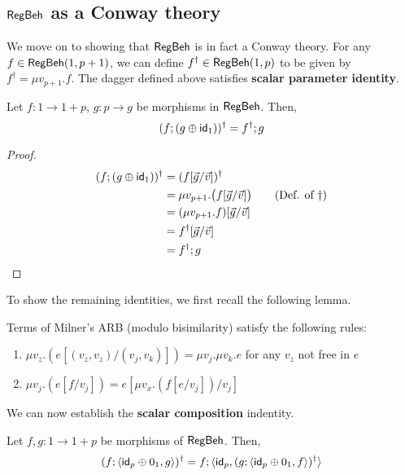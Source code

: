 \subsection{$\mathsf{RegBeh}$ as a Conway theory}
We move on to showing that $\mathsf{RegBeh}$ is in fact a Conway theory. For any $f \in \mathsf{RegBeh}(1, p + 1)$, we can define $f^\dagger \in \mathsf{RegBeh}(1,p)$ to be given by $f^\dagger = \mu v_{p+1}.f$.
The dagger defined above satisfies \textbf{scalar parameter identity}.
\begin{lemma}\label{conway1}
	Let $f \colon 1 \to 1 + p$, $g \colon p \to g$ be morphisms in $\mathsf{RegBeh}$. Then,
	$$
	(f ; (g\oplus \mathsf{id}_1))^\dagger = f^\dagger ; g
	$$
\end{lemma}
\begin{proof}
\begin{align*}
(f ; (g \oplus \mathsf{id}_1))^\dagger & = (f[\vec{g}/\vec{v}])^\dagger
\\
& = \mu v_{p+1}.\big(f[\vec{g}/\vec{v}]\big) \tag{Def. of $\dagger$}
\\
& = (\mu v_{p+1}.f)[\vec{g}/\vec{v}] 
\\
& = f^\dagger[\vec{g}/\vec{v}] 
\\
& = f^\dagger ; g
\end{align*}
\end{proof}
To show the remaining identities, we first recall the following lemma.
 \begin{lemma}
\label{lem:recursion-substitution}
Terms of Milner's ARB (modulo bisimilarity) satisfy the following rules:
	\begin{enumerate}
		\item $\mu v_z. \left(e [(v_z, v_z) / (v_j, v_k)]\right) = \mu v_j. \mu v_k. e$ for any $v_z$ not free in $e$
		\item $ \mu v_j.\left(e[f/v_j]\right) = e[\mu v_x. \left(f[e/v_j]\right)/v_j]$
	\end{enumerate}
\end{lemma}
We can now establish the \textbf{scalar composition} indentity.
\begin{lemma}\label{conway2}
Let $f,g \colon 1 \to 1 + p$ be morphisms of $\mathsf{RegBeh}$. Then,
		$$
		(f ; \langle  \mathsf{id}_p \oplus 0_1 , g \rangle)^\dagger = f ; \langle \mathsf{id}_p, (g ;  \langle  \mathsf{id}_p \oplus 0_1 , f\rangle)^\dagger\rangle
		$$ 
\end{lemma}
